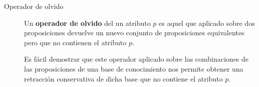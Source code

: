  	\begin{description}
 		\item[Operador de olvido]  	
	 		Un \textbf{operador de olvido} del un atributo $p$ es aquel que aplicado sobre dos proposiciones devuelve un 
	 		nuevo conjunto de proposiciones equivalentes pero que no contienen el atributo $p$.
	 		
	 		Es fácil demostrar que este operador aplicado sobre las combinaciones de las proposiciones de una base de conocimiento
	 		nos permite obtener una retracción conservativa de dicha base que no contiene el atributo $p$.
 	\end{description}
	 		
 